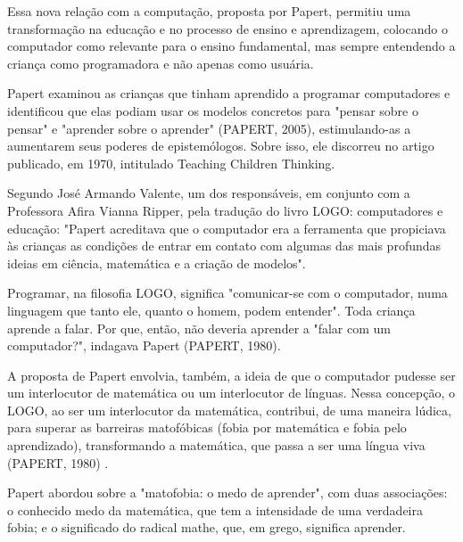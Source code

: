 Essa nova relação com a computação, proposta por Papert, permitiu uma transformação na educação e no processo de ensino e aprendizagem, colocando o computador como relevante para o ensino fundamental, mas sempre entendendo a criança como programadora e não apenas como usuária.

Papert examinou as crianças que tinham aprendido a programar computadores e identificou que elas podiam usar os modelos concretos para "pensar sobre o pensar" e "aprender sobre o aprender"  (PAPERT, 2005), estimulando-as  a aumentarem seus poderes de epistemólogos. Sobre isso, ele discorreu no artigo publicado, em 1970, intitulado Teaching Children Thinking.

Segundo José Armando Valente, um dos responsáveis, em conjunto com a Professora Afira Vianna Ripper, pela tradução do livro LOGO: computadores e educação: "Papert acreditava que o computador era a ferramenta que propiciava às crianças as condições de entrar em contato com algumas das mais profundas ideias em ciência, matemática e a criação de modelos".

Programar, na filosofia LOGO, significa "comunicar-se com o computador, numa linguagem que tanto ele, quanto o homem,  podem entender". Toda criança aprende a falar. Por que, então, não deveria aprender a "falar com um computador?", indagava Papert  (PAPERT, 1980).

A proposta de Papert envolvia, também, a ideia de que o computador pudesse ser um interlocutor  de matemática ou um interlocutor de línguas. Nessa concepção, o LOGO, ao ser um interlocutor da matemática, contribui, de uma maneira lúdica, para superar as barreiras matofóbicas (fobia por matemática e fobia pelo aprendizado), transformando a matemática, que passa a ser uma língua viva (PAPERT, 1980) .

Papert abordou sobre a "matofobia: o medo de aprender", com duas associações: o conhecido medo da matemática, que tem a intensidade de uma verdadeira fobia; e o  significado do radical mathe, que, em grego, significa aprender.


\noindent\begin{center}\mbox{\centering{}}\end{center}


